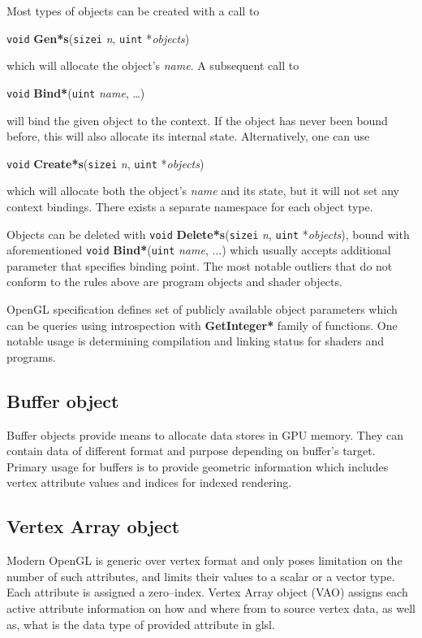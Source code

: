 \noindent Most types of objects can be created with a call to
\begin{center}
    \texttt{void} \textbf{Gen*s}(\texttt{sizei} \textit{n}, \texttt{uint} *\textit{objects})
\end{center}
\noindent which will allocate the object's \textit{name}. A subsequent call to
\begin{center}
    \texttt{void} \textbf{Bind*}(\texttt{uint} \textit{name}, \ldots)
\end{center}
\noindent will bind the given object to the context. If the object has never been bound before, this will also allocate its internal state. Alternatively, one can use
\begin{center}
    \texttt{void} \textbf{Create*s}(\texttt{sizei} \textit{n}, \texttt{uint} *\textit{objects})
\end{center}
\noindent which will allocate both the object's \textit{name} and its state, but it will not set any context bindings. There exists a separate namespace for each object type.

Objects can be deleted with \texttt{void} \textbf{Delete*s}(\texttt{sizei} \textit{n}, \texttt{uint} *\textit{objects}), bound with aforementioned \texttt{void} \textbf{Bind*}(\texttt{uint} \textit{name}, ...) which usually accepts additional parameter that specifies binding point.
The most notable outliers that do not conform to the rules above are program objects and shader objects.

OpenGL specification defines set of publicly available object parameters which can be queries using introspection with \textbf{GetInteger*} family of functions. One notable usage is determining compilation and linking status for shaders and programs. 
\subsection{Buffer object}

Buffer objects provide means to allocate data stores in GPU memory. They can contain data of different format and purpose depending on buffer's target. Primary usage for buffers is to provide geometric information which includes vertex attribute values and indices for indexed rendering.

\subsection{Vertex Array object}

Modern OpenGL is generic over vertex format and only poses limitation on the number of such attributes, and limits their values to a scalar or a vector type.
Each attribute is assigned a zero--index. Vertex Array object (VAO) assigns each active 
attribute information on how and where from to source vertex data, as well as, what is the
data type of provided attribute in glsl.

